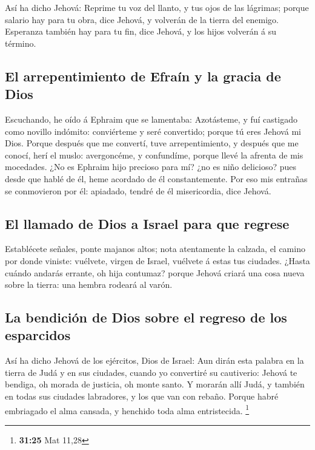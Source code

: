  Así ha dicho Jehová: Reprime tu voz del llanto, y tus
ojos de las lágrimas; porque salario hay para tu obra, dice Jehová, y
volverán de la tierra del enemigo.  Esperanza también hay
para tu fin, dice Jehová, y los hijos volverán á su término.

\hypertarget{el-arrepentimiento-de-efrauxedn-y-la-gracia-de-dios}{%
\subsection{El arrepentimiento de Efraín y la gracia de
Dios}\label{el-arrepentimiento-de-efrauxedn-y-la-gracia-de-dios}}

 Escuchando, he oído á Ephraim que se lamentaba:
Azotásteme, y fuí castigado como novillo indómito: conviérteme y seré
convertido; porque tú eres Jehová mi Dios.  Porque
después que me convertí, tuve arrepentimiento, y después que me conocí,
herí el muslo: avergoncéme, y confundíme, porque llevé la afrenta de mis
mocedades.  ¿No es Ephraim hijo precioso para mí? ¿no es
niño delicioso? pues desde que hablé de él, heme acordado de él
constantemente. Por eso mis entrañas se conmovieron por él: apiadado,
tendré de él misericordia, dice Jehová.

\hypertarget{el-llamado-de-dios-a-israel-para-que-regrese}{%
\subsection{El llamado de Dios a Israel para que
regrese}\label{el-llamado-de-dios-a-israel-para-que-regrese}}

 Establécete señales, ponte majanos altos; nota
atentamente la calzada, el camino por donde viniste: vuélvete, virgen de
Israel, vuélvete á estas tus ciudades.  ¿Hasta cuándo
andarás errante, oh hija contumaz? porque Jehová criará una cosa nueva
sobre la tierra: una hembra rodeará al varón.

\hypertarget{la-bendiciuxf3n-de-dios-sobre-el-regreso-de-los-esparcidos}{%
\subsection{La bendición de Dios sobre el regreso de los
esparcidos}\label{la-bendiciuxf3n-de-dios-sobre-el-regreso-de-los-esparcidos}}

 Así ha dicho Jehová de los ejércitos, Dios de Israel:
Aun dirán esta palabra en la tierra de Judá y en sus ciudades, cuando yo
convertiré su cautiverio: Jehová te bendiga, oh morada de justicia, oh
monte santo.  Y morarán allí Judá, y también en todas sus
ciudades labradores, y los que van con rebaño.  Porque
habré embriagado el alma cansada, y henchido toda alma entristecida.
\footnote{\textbf{31:25} Mat 11,28}

